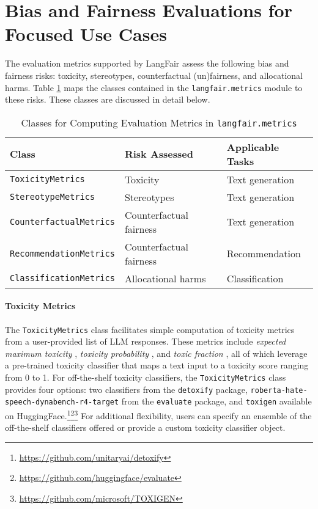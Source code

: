 \documentclass[
]{article}
\begin{document}
\section{Bias and Fairness Evaluations for Focused Use Cases}
The evaluation metrics supported by LangFair assess the following bias and fairness risks: toxicity, stereotypes, counterfactual (un)fairness, and allocational harms. Table \ref{tab:metrics} maps the classes contained in the \texttt{langfair.metrics} module to these risks. These classes are discussed in detail below.


\begin{table}[H]
\centering
\caption{Classes for Computing Evaluation Metrics in \texttt{langfair.metrics}}
\label{tab:metrics}
\begin{tabular}{lll}
Class                                           & Risk Assessed             & Applicable Tasks           \\
\toprule
\texttt{ToxicityMetrics}       & Toxicity                  & Text generation \\
\texttt{StereotypeMetrics}     & Stereotypes               & Text generation \\
\texttt{CounterfactualMetrics} & Counterfactual fairness & Text generation \\
\texttt{RecommendationMetrics} & Counterfactual fairness & Recommendation  \\
\texttt{ClassificationMetrics} & Allocational harms        & Classification  \\     
\bottomrule
\end{tabular}
\end{table}


\paragraph{Toxicity Metrics}
The \texttt{ToxicityMetrics} class facilitates simple computation of toxicity metrics from a user-provided list of LLM responses. These metrics include \textit{expected maximum toxicity} \cite{Gehman2020RealToxicityPromptsEN}, \textit{toxicity probability} \cite{Gehman2020RealToxicityPromptsEN}, and \textit{toxic fraction} \cite{liang2023holisticevaluationlanguagemodels}, all of which leverage a pre-trained toxicity classifier that maps a text input to a toxicity score ranging from 0 to 1. For off-the-shelf toxicity classifiers, the \texttt{ToxicityMetrics} class provides four options: two classifiers from the \texttt{detoxify} package, \texttt{roberta-hate-speech-dynabench-r4-target} from the \texttt{evaluate} package, and \texttt{toxigen} available on HuggingFace.\footnote{\url{https://github.com/unitaryai/detoxify}}\footnote{\url{https://github.com/huggingface/evaluate}}\footnote{\url{https://github.com/microsoft/TOXIGEN}} For additional flexibility, users can specify an ensemble of the off-the-shelf classifiers offered or provide a custom toxicity classifier object. 
\end{document}
